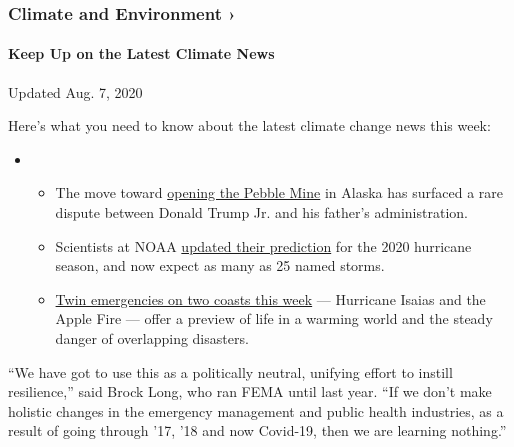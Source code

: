 \href{https://www.nytimes.com/section/climate?action=click\&pgtype=Article\&state=default\&region=MAIN_CONTENT_1\&context=storylines_keepup}{}

\hypertarget{climate-and-environment-}{%
\subsubsection{Climate and Environment
›}\label{climate-and-environment-}}

\hypertarget{keep-up-on-the-latest-climate-news}{%
\paragraph{Keep Up on the Latest Climate
News}\label{keep-up-on-the-latest-climate-news}}

Updated Aug. 7, 2020

Here's what you need to know about the latest climate change news this
week:

\begin{itemize}
\item
  \begin{itemize}
  \tightlist
  \item
    The move toward
    \href{https://www.nytimes.com/2020/08/05/us/politics/pebble-mine-trump-alaska.html?action=click\&pgtype=Article\&state=default\&region=MAIN_CONTENT_1\&context=storylines_keepup}{opening
    the Pebble Mine} in Alaska has surfaced a rare dispute between
    Donald Trump Jr. and his father's administration.
  \item
    Scientists at NOAA
    \href{https://www.nytimes.com/2020/08/06/climate/hurricanes-noaa-prediction.html?action=click\&pgtype=Article\&state=default\&region=MAIN_CONTENT_1\&context=storylines_keepup}{updated
    their prediction} for the 2020 hurricane season, and now expect as
    many as 25 named storms.
  \item
    \href{https://www.nytimes.com/2020/08/04/climate/hurricane-isaias-apple-fire-climate.html?action=click\&pgtype=Article\&state=default\&region=MAIN_CONTENT_1\&context=storylines_keepup}{Twin
    emergencies on two coasts this week} --- Hurricane Isaias and the
    Apple Fire --- offer a preview of life in a warming world and the
    steady danger of overlapping disasters.
  \end{itemize}
\end{itemize}

``We have got to use this as a politically neutral, unifying effort to
instill resilience,'' said Brock Long, who ran FEMA until last year.
``If we don't make holistic changes in the emergency management and
public health industries, as a result of going through '17, '18 and now
Covid-19, then we are learning nothing.''


